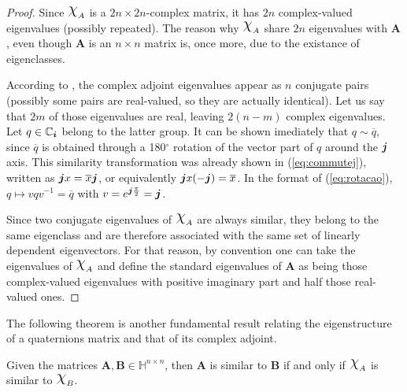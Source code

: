 \begin{proof}
    Since $\rchi_A$ is a $ 2n \times 2n $-complex matrix, it has $ 2n $ complex-valued eigenvalues (possibly repeated). The reason why $\rchi_A$ share $2n$ eigenvalues with $\mathbf{A}$, even though $\mathbf{A}$ is an $ n \times n $ matrix is, once more, due to the existance of eigenclasses.

    According to \cite[Theorem 5]{lee1948eigenvalues}, the complex adjoint eigenvalues appear as $ n $ conjugate pairs (possibly some pairs are real-valued, so they are actually identical). Let us say that $2m$ of those eigenvalues are real, leaving $2(n-m)$ complex eigenvalues. Let $ q \in \mathbb{C}_{\boldsymbol{i}}$ belong to the latter group. It can be shown imediately that $ q \sim \overline{q} $, since $ \overline{q} $ is obtained through a 180$ ^\circ $ rotation of the vector part of $ q $ around the $ \boldsymbol{j} $ axis. This similarity transformation was already shown in (\ref{eq:commutej}), written as $\boldsymbol{j} x = \overline{x} \boldsymbol{j}$, or equivalently $\boldsymbol{j} x (-\boldsymbol{j})= \overline{x}$. In the format of (\ref{eq:rotacao}), $ q \mapsto v q v^{-1} = \overline{q}$ with $ v = e^{\boldsymbol{j} \frac{\pi}{2}} = \boldsymbol{j} $.

    Since two conjugate eigenvalues of $ \rchi_A $ are always similar, they belong to the same eigenclass and are therefore associated with the same set of linearly dependent eigenvectors. For that reason, by convention one can take the eigenvalues of $ \rchi_A $ and define the standard eigenvalues of $\mathbf{A}$ as being those complex-valued eigenvalues with positive imaginary part and half those real-valued ones.
\end{proof}

The following theorem is another fundamental result relating the eigenstructure of a quaternions matrix and that of its complex adjoint.

\begin{theorem}
    \label{th:diagonal}
    Given the matrices $ \mathbf{A}, \mathbf{B} \in \mathbb{H}^{n \times n} $, then $ \mathbf{A} $ is similar to $ \mathbf{B} $ if and only if $ \rchi_A $ is similar to $ \rchi_B $.
\end{theorem}

